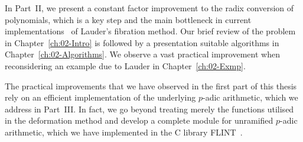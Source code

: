 In Part~{II}, we present a constant factor improvement to the 
radix conversion of polynomials, which is a key step and the 
main bottleneck in current implementations~\citep{Lauder2006,Walker2009} 
of Lauder's fibration method.  Our brief review of the problem 
in Chapter~\ref{ch:02-Intro} is followed by a presentation suitable 
algorithms in Chapter~\ref{ch:02-Algorithms}.  We observe a vast 
practical improvement when reconsidering an example due to Lauder 
in Chapter~\ref{ch:02-Exmp}.

The practical improvements that we have observed in the first part of 
this thesis rely on an efficient implementation of the underlying 
$p$-adic arithmetic, which we address in Part~{III}.  In fact, we 
go beyond treating merely the functions utilised in the deformation 
method and develop a complete module for unramified $p$-adic arithmetic, 
which we have implemented in the C library {\sc FLINT}~\citep{FLINT}.

